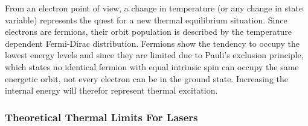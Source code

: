 From an electron point of view, a change in temperature (or any change in state variable) represents the quest for a new thermal equilibrium situation. Since electrons are fermions, their orbit population is described by the temperature dependent Fermi-Dirac distribution. Fermions show the tendency to occupy the lowest energy levels and since they are limited due to Pauli's exclusion principle, which states no identical fermion with equal intrinsic spin can occupy the same energetic orbit, not every electron can be in the ground state. Increasing the internal energy will therefor represent thermal excitation.  

\subsubsection{Theoretical Thermal Limits For Lasers}
	

